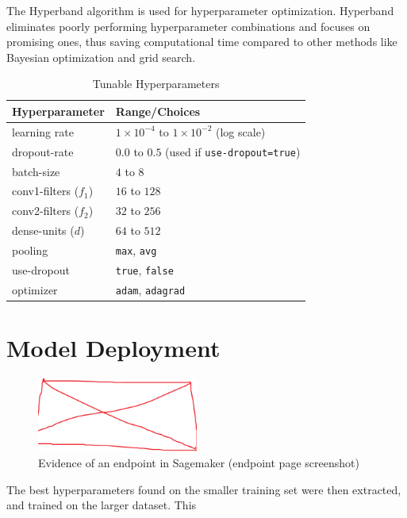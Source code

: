 The Hyperband algorithm is used for hyperparameter optimization. Hyperband eliminates poorly performing hyperparameter combinations and focuses on promising ones, thus saving computational time compared to other methods like Bayesian optimization and grid search. 

\begin{table}[h]
\centering
\caption{Tunable Hyperparameters}
\begin{tabular}{ll}
\toprule
\textbf{Hyperparameter} & \textbf{Range/Choices} \\
\midrule
learning rate           & $1{\times}10^{-4}$ to $1{\times}10^{-2}$ (log scale) \\
dropout-rate            & $0.0$ to $0.5$ (used if \texttt{use-dropout=true}) \\
batch-size              & $4$ to $8$ \\
conv1-filters ($f_1$)   & $16$ to $128$ \\
conv2-filters ($f_2$)   & $32$ to $256$ \\
dense-units ($d$)       & $64$ to $512$ \\
pooling                 & \texttt{max}, \texttt{avg} \\
use-dropout             & \texttt{true}, \texttt{false} \\
optimizer               & \texttt{adam}, \texttt{adagrad} \\
\bottomrule
\end{tabular}
\label{tab:tunable_hyperparameters}
\end{table}


\section{Model Deployment}


\begin{figure}[h]
    \centering
    \includegraphics[width=200px]{figures/placeholder.png} %
    \centering
    \caption{Evidence of an endpoint in Sagemaker (endpoint page screenshot)} %
    \label{fig:endpoint} %
\end{figure}

The best hyperparameters found on the smaller training set were then extracted, and trained on the larger dataset. This 

